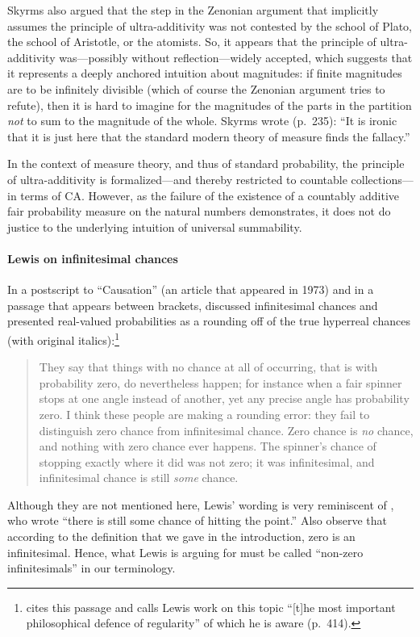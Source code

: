 Skyrms also argued that the step in the Zenonian argument that implicitly assumes the principle of ultra-additivity was not contested by the school of Plato, the school of Aristotle, or the atomists. So, it appears that the principle of ultra-additivity was---possibly without reflection---widely accepted, which suggests that it represents a deeply anchored intuition about magnitudes: if finite magnitudes are to be infinitely divisible (which of course the Zenonian argument tries to refute), then it is hard to imagine for the magnitudes of the parts in the partition \emph{not} to sum to the magnitude of the whole.
Skyrms wrote (p.~235): ``It is ironic that it is just here that the standard modern theory of measure finds the fallacy.''

In the context of measure theory, and thus of standard probability, the principle of ultra-additivity is formalized---and thereby restricted to countable collections---in terms of CA. However, as the failure of the existence of a countably additive fair probability measure on the natural numbers demonstrates, it does not do justice to the underlying intuition of universal summability.

\paragraph{Lewis on infinitesimal chances}
In a postscript to ``Causation'' (an article that appeared in 1973) and in a passage that appears between brackets, \citet[pp.~175--176]{Lewis:1986} discussed infinitesimal chances and presented real-valued probabilities as a rounding off of the true hyperreal chances (with original italics):\footnote{\citet{Hajek:2012a} cites this passage and calls Lewis work on this topic ``[t]he most important philosophical defence of regularity'' of which he is aware (p.~414).}
\begin{quote}
They say that things with no chance at all of occurring, that is with probability zero, do nevertheless happen; for instance when a fair spinner stops at one angle instead of another, yet any precise angle has probability zero. I think these people are making a rounding error: they fail to distinguish zero chance from infinitesimal chance. Zero chance is \emph{no} chance, and nothing with zero chance ever happens. The spinner's chance of stopping exactly where it did was not zero; it was infinitesimal, and infinitesimal chance is still \emph{some} chance.
\end{quote}
Although they are not mentioned here, Lewis' wording is very reminiscent of \citet{BernsteinWattenberg:1969}, who wrote ``there is still some chance of hitting the point.'' Also observe that according to the definition that we gave in the introduction, zero is an infinitesimal. Hence, what Lewis is arguing for must be called ``non-zero infinitesimals'' in our terminology.

